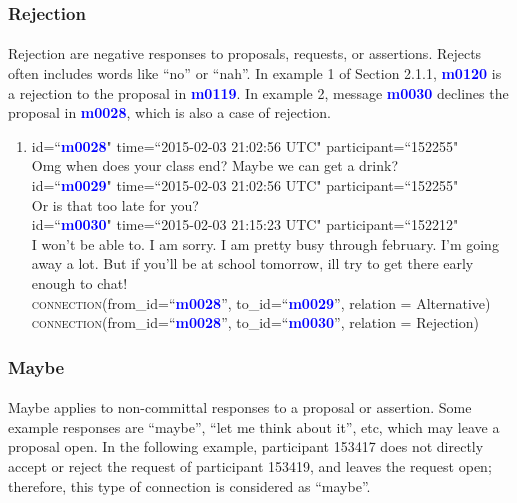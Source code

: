 \documentclass{article}
\begin{document}
\subsubsection{Rejection}
\paragraph{}
Rejection are negative responses to proposals, requests, or assertions. Rejects often includes words like ``no'' or ``nah''. In example 1 of Section 2.1.1, \textbf{\textcolor{blue}{m0120}} is a rejection to the proposal in \textbf{\textcolor{blue}{m0119}}. In example 2, message \textbf{\textcolor{blue}{m0030}} declines the proposal in \textbf{\textcolor{blue}{m0028}}, which is also a case of rejection.
\begin{enumerate}[resume]
\item id=``\textbf{\textcolor{blue}{m0028}}" time=``2015-02-03 21:02:56 UTC" participant=``152255"\\
Omg when does your class end? Maybe we can get a drink?\\
id=``\textbf{\textcolor{blue}{m0029}}" time=``2015-02-03 21:02:56 UTC" participant=``152255"\\
Or is that too late for you?\\
id=``\textbf{\textcolor{blue}{m0030}}" time=``2015-02-03 21:15:23 UTC" participant=``152212"\\
I won't be able to. I am sorry. I am pretty busy through february. I'm going away a lot. But if you'll be at school tomorrow, ill try to get there early enough to chat!\\
\textsc{connection}(from\_id=``\textbf{\textcolor{blue}{m0028}}'', to\_id=``\textbf{\textcolor{blue}{m0029}}'', relation = Alternative)\\
\textsc{connection}(from\_id=``\textbf{\textcolor{blue}{m0028}}'', to\_id=``\textbf{\textcolor{blue}{m0030}}'', relation = Rejection)\\
\end{enumerate}

\subsubsection{Maybe}
\paragraph{}
Maybe applies to non-committal responses to a proposal or assertion. Some example responses are ``maybe'', ``let me think about it'', etc, which may leave a proposal open. In the following example, participant 153417 does not directly accept or reject the request of participant 153419, and leaves the request open; therefore, this type of connection is considered as ``maybe''.
\end{document}
